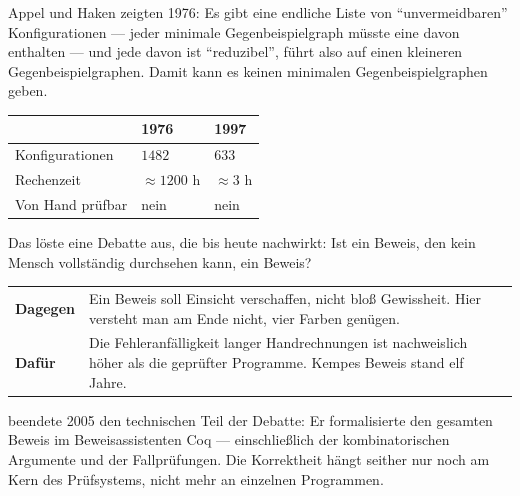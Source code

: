 \begin{forschung}
Appel und Haken zeigten 1976: Es gibt eine endliche Liste von \enquote{unvermeidbaren} Konfigurationen --- jeder minimale Gegenbeispielgraph müsste eine davon enthalten --- und jede davon ist \enquote{reduzibel}, führt also auf einen kleineren Gegenbeispielgraphen. Damit kann es keinen minimalen Gegenbeispielgraphen geben.

\begin{center}
{\small
\renewcommand{\arraystretch}{1.45}
\begin{tabular}{@{}P{3.0cm}P{2.2cm}P{2.8cm}@{}}
\toprule
& \textbf{1976} & \textbf{1997}\\
\midrule
Konfigurationen & $1482$ & $633$\\
Rechenzeit & $\approx 1200$ h & $\approx 3$ h\\
Von Hand prüfbar & \textcolor{akzent}{nein} & \textcolor{akzent}{nein}\\
\bottomrule
\end{tabular}}
\end{center}

Das löste eine Debatte aus, die bis heute nachwirkt: Ist ein Beweis, den kein Mensch vollständig durchsehen kann, ein Beweis?

\begin{center}
\renewcommand{\arraystretch}{1.5}
\begin{tabular}{@{}P{2.4cm}P{6.2cm}@{}}
\toprule
\textbf{Dagegen} & Ein Beweis soll Einsicht verschaffen, nicht bloß Gewissheit. Hier versteht man am Ende nicht,  vier Farben genügen.\\
\textbf{Dafür} & Die Fehleranfälligkeit langer Handrechnungen ist nachweislich höher als die geprüfter Programme. Kempes Beweis stand elf Jahre.\\
\bottomrule
\end{tabular}
\end{center}

 beendete 2005 den technischen Teil der Debatte: Er formalisierte den gesamten Beweis im Beweisassistenten Coq --- einschließlich der kombinatorischen Argumente und der Fallprüfungen. Die Korrektheit hängt seither nur noch am Kern des Prüfsystems, nicht mehr an einzelnen Programmen.

\begin{center}
\begin{minipage}{0.88\textwidth}
\end{minipage}
\end{center}
\end{forschung}

